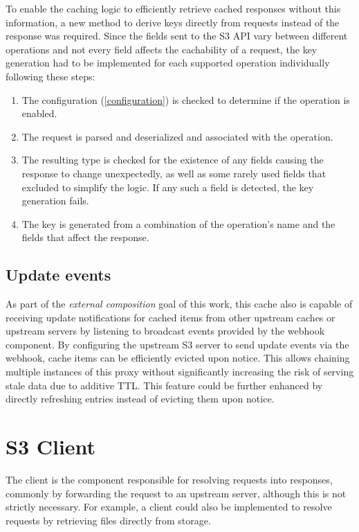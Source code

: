 To enable the caching logic to efficiently retrieve cached responses without this information, a new method to derive keys directly from requests instead of the response was required. Since the fields sent to the S3 API vary between different operations and not every field affects the cachability of a request, the key generation had to be implemented for each supported operation individually following these steps:
\begin{enumerate}
	\item The configuration (\ref{configuration}) is checked to determine if the operation is enabled.
	\item The request is parsed and deserialized and associated with the operation.
	\item The resulting type is checked for the existence of any fields causing the response to change unexpectedly, as well as some rarely used fields that excluded to simplify the logic. If any such a field is detected, the key generation fails.
	\item The key is generated from a combination of the operation's name and the fields that affect the response.
\end{enumerate}

\subsection{Update events}
\label{cache:event}
As part of the \textit{external composition} goal of this work, this cache also is capable of receiving update notifications for cached items from other upstream caches or upstream servers by listening to broadcast events provided by the webhook component. By configuring the upstream S3 server to send update events via the webhook, cache items can be efficiently evicted upon notice. This allows chaining multiple instances of this proxy without significantly increasing the risk of serving stale data due to additive TTL.
This feature could be further enhanced by directly refreshing entries instead of evicting them upon notice.

\section{S3 Client}

The client is the component responsible for resolving requests into responses, commonly by forwarding the request to an upstream server, although this is not strictly necessary. For example, a client could also be implemented to resolve requests by retrieving files directly from storage.

